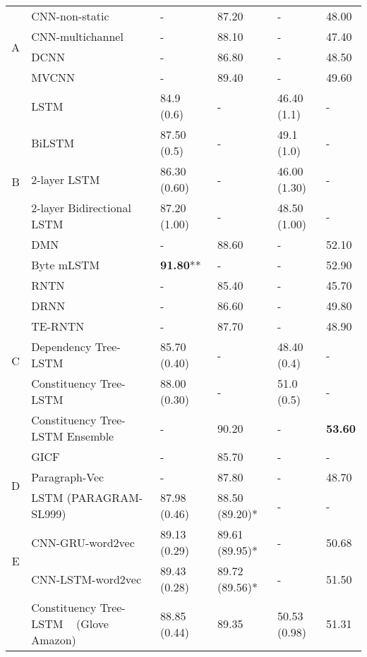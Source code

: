 \begin{table*}[]
\begin{tabular}{|c|l|ll|ll|}
		\multirow{4}{*}{A} & CNN-non-static~\cite{KimCNN} & - & 87.20 & - & 48.00 \Tstrut \\
		& CNN-multichannel~\cite{KimCNN} & - & 88.10 & - & 47.40\\
		& DCNN~\cite{DCNN} & - & 86.80 & - & 48.50 \\
		& MVCNN~\cite{2-layer-cnn} & - & 89.40 & - & 49.60 \\
		\hline
		\multirow{6}{*}{B} & LSTM~\cite{treeLSTM}   & 84.9 (0.6) & - & 46.40 (1.1)& - \\
		& BiLSTM~\cite{treeLSTM}  & 87.50 (0.5) & - & 49.1 (1.0) & -  \\
		& 2-layer LSTM~\cite{treeLSTM} & 86.30 (0.60) & - & 46.00 (1.30) & -\\
		& 2-layer Bidirectional LSTM~\cite{treeLSTM} & 87.20 (1.00) & - & 48.50 (1.00) & -\\
		& DMN~\cite{attention-gru} & - & 88.60 & - & 52.10 \\
		& Byte mLSTM~\cite{mlstm} & \textbf{91.80}** & - & - & 52.90 \\
		\hline
		\multirow{6}{*}{C} & RNTN~\cite{socher2013recursive}  & - & 85.40 & - & 45.70 \\
		& DRNN~\cite{IrsoyDRNN} & - & 86.60 & - & 49.80  \\
		& TE-RNTN~\cite{tag-embedding-rnn} & - & 87.70 & - & 48.90\\
		& Dependency Tree-LSTM~\cite{treeLSTM}  & 85.70 (0.40)  & - & 48.40 (0.4) & - \\
		& Constituency Tree-LSTM~\cite{treeLSTM} & 88.00 (0.30)    &  - & 51.0 (0.5) & - \\
		& Constituency Tree-LSTM Ensemble~\cite{LooksHHN17} & - & 90.20 & - & \textbf{53.60} \\
		\hline
		\multirow{3}{*}{D} & GICF~\cite{group-instance} & - & 85.70 & - & - \\
		& Paragraph-Vec~\cite{ParagraphVec} & - & 87.80 & - & 48.70 \\
		& LSTM (PARAGRAM-SL999)~\cite{wieting2015towards} & 87.98 (0.46) & 88.50 (89.20)* & -  & -
		\\
		\hline
		\multirow{2}{*}{E}  & CNN-GRU-word2vec~\cite{cnn-rnn}                    & 89.13 (0.29)  &  89.61 (89.95)* & - & 50.68 \\
		& CNN-LSTM-word2vec~\cite{cnn-rnn}                    & 89.43 (0.28)  & 89.72 (89.56)* & - & 51.50 \Bstrut    \\
		\Xhline{3\arrayrulewidth}
		\Xhline{3\arrayrulewidth}
		\multirow{6}{*}{F} & Constituency Tree-LSTM ~\cite{treeLSTM} (Glove Amazon) & 88.85 (0.44) & 89.35 & 50.53 (0.98) & 51.31 \Tstrut \\

\end{tabular}
\end{table*}
